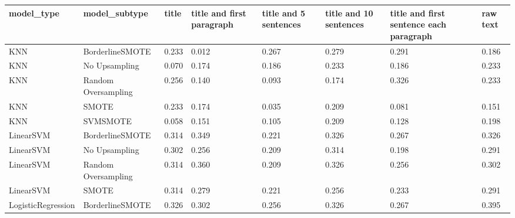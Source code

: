 \begin{tabular}{llllllll}
\toprule
                  model\_type &       model\_subtype &     title & title and first paragraph & title and 5 sentences & title and 10 sentences & title and first sentence each paragraph &  raw text \\
\midrule
                         KNN &     BorderlineSMOTE &     0.233 &                     0.012 &                 0.267 &                  0.279 &                                   0.291 &     0.186 \\
                         KNN &       No Upsampling &     0.070 &                     0.174 &                 0.186 &                  0.233 &                                   0.186 &     0.233 \\
                         KNN & Random Oversampling &     0.256 &                     0.140 &                 0.093 &                  0.174 &                                   0.326 &     0.233 \\
                         KNN &               SMOTE &     0.233 &                     0.174 &                 0.035 &                  0.209 &                                   0.081 &     0.151 \\
                         KNN &            SVMSMOTE &     0.058 &                     0.151 &                 0.105 &                  0.209 &                                   0.128 &     0.198 \\
                   LinearSVM &     BorderlineSMOTE &     0.314 &                     0.349 &                 0.221 &                  0.326 &                                   0.267 &     0.326 \\
                   LinearSVM &       No Upsampling &     0.302 &                     0.256 &                 0.209 &                  0.314 &                                   0.198 &     0.291 \\
                   LinearSVM & Random Oversampling &     0.314 &                     0.360 &                 0.209 &                  0.326 &                                   0.256 &     0.302 \\
                   LinearSVM &               SMOTE &     0.314 &                     0.279 &                 0.221 &                  0.256 &                                   0.233 &     0.291 \\
          LogisticRegression &     BorderlineSMOTE &     0.326 &                     0.302 &                 0.256 &                  0.326 &                                   0.267 &     0.395 \\

\end{tabular}
